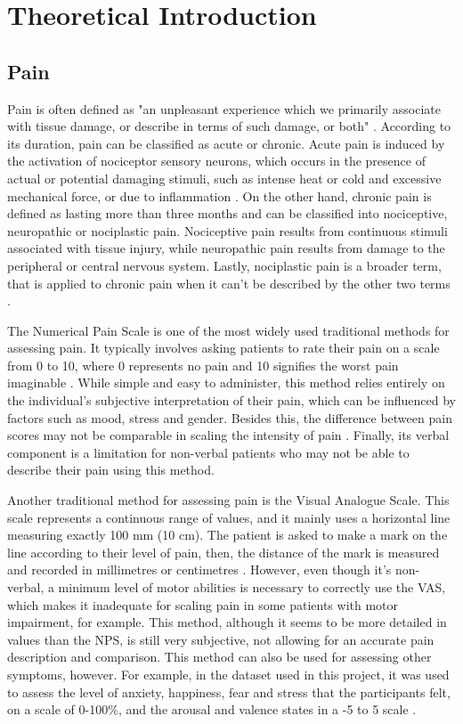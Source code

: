 \chapter{Theoretical Introduction}


\section{Pain}

Pain is often defined as "an unpleasant experience which we primarily 
associate with tissue damage, or describe in terms
of such damage, or both" \cite{Fang2025}. According to its duration, pain can be classified as acute or chronic. Acute pain is induced by the activation of nociceptor sensory neurons, which occurs in the presence of actual or potential damaging stimuli, such as intense heat or cold and excessive mechanical force, or due to inflammation \cite{Jayakar2021}. On the other hand, chronic pain is defined as lasting more than three months \cite{Raman2022} and can be classified into nociceptive, neuropathic or nociplastic pain. Nociceptive pain results from continuous stimuli associated with tissue injury, while neuropathic pain results from damage to the peripheral or central nervous system. Lastly, nociplastic pain is a broader term, that is applied to chronic pain when it can't be described by the other two terms \cite{Fitzcharles2021}.

The Numerical Pain Scale is one of the most widely used traditional methods for assessing pain. It typically involves asking patients to rate their pain on a scale from 0 to 10, where 0 represents no pain and 10 signifies the worst pain imaginable \cite{Nugent2021}. While simple and easy to administer, this method relies entirely on the individual’s subjective interpretation of their pain, which can be influenced by factors such as mood, stress and gender. Besides this, the difference between pain scores may not be comparable in scaling the intensity of pain \cite{Adeboye2021}. Finally, its verbal component is a limitation for non-verbal patients who may not be able to describe their pain using this method.

Another traditional method for assessing pain is the Visual Analogue Scale. This scale represents a continuous range of values, and it mainly uses a horizontal line measuring exactly 100 mm (10 cm). The patient is asked to make a mark on the line according to their level of pain, then, the distance of the mark is measured and recorded in millimetres or centimetres \cite{Bielewicz2022}. However, even though it’s non-verbal, a minimum level of motor abilities is necessary to correctly use the VAS, which makes it inadequate for scaling pain in some patients with motor impairment, for example. This method, although it seems to be more detailed in values than the NPS, is still very subjective, not allowing for an accurate pain description and comparison. This method can also be used for assessing other symptoms, however. For example, in the dataset used in this project, it was used to assess the level of anxiety, happiness, fear and stress that the participants felt, on a scale of 0-100\%, and the arousal and valence states in a -5 to 5 scale \cite{Alves2024}.

